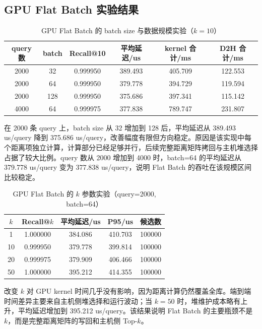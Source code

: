 \documentclass[a4paper]{article}
\begin{document}
\subsection{GPU Flat Batch 实验结果}

\begin{table}[H]
\centering
\caption{GPU Flat Batch 的 batch size 与数据规模实验（$k=10$）}
\begin{tabular}{cccccc}
\toprule
query 数 & batch & Recall@10 & 平均延迟/us & kernel 合计/ms & D2H 合计/ms \\
\midrule
2000 & 32 & 0.999950 & 389.493 & 405.709 & 122.553 \\
2000 & 64 & 0.999950 & 379.778 & 394.729 & 119.594 \\
2000 & 128 & 0.999950 & 375.686 & 397.341 & 115.142 \\
4000 & 64 & 0.999975 & 377.838 & 789.747 & 231.807 \\
\bottomrule
\end{tabular}
\end{table}

在 2000 条 query 上，batch size 从 32 增加到 128 后，平均延迟从 389.493 us/query 降到 375.686 us/query，改善幅度有限但方向稳定。原因是该实现中每个距离项独立计算，计算部分已经足够并行，后续完整距离矩阵拷回与主机堆选择占据了较大比例。query 数从 2000 增加到 4000 时，batch=64 的平均延迟从 379.778 us/query 变为 377.838 us/query，说明 Flat Batch 的吞吐在该规模区间比较稳定。

\begin{table}[H]
\centering
\caption{GPU Flat Batch 的 $k$ 参数实验（query=2000, batch=64）}
\begin{tabular}{ccccc}
\toprule
$k$ & Recall@$k$ & 平均延迟/us & P95/us & 候选数 \\
\midrule
1 & 1.000000 & 384.086 & 410.703 & 100000 \\
10 & 0.999950 & 379.778 & 399.814 & 100000 \\
20 & 0.999975 & 379.909 & 406.466 & 100000 \\
50 & 1.000000 & 395.212 & 414.355 & 100000 \\
\bottomrule
\end{tabular}
\end{table}

改变 $k$ 对 GPU kernel 时间几乎没有影响，因为距离计算仍然覆盖全库。端到端时间差异主要来自主机侧堆选择和运行波动；当 $k=50$ 时，堆维护成本略有上升，平均延迟增加到 395.212 us/query。该结果说明 Flat Batch 的主要瓶颈不是 $k$，而是完整距离矩阵的写回和主机侧 Top-$k$。
\end{document}
